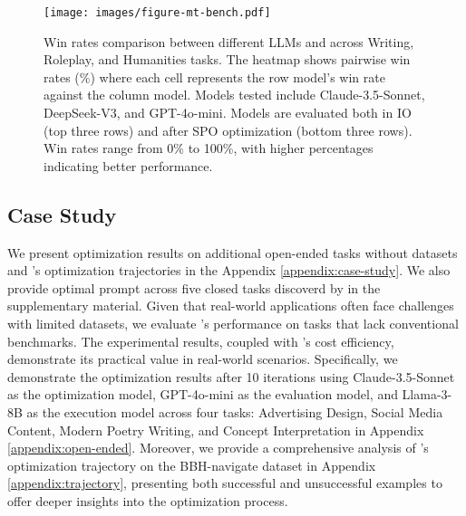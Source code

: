 \begin{figure}[t!]
  \centering
  \texttt{[image: images/figure-mt-bench.pdf]}
  \vspace{-2em}
  \caption{Win rates comparison between different LLMs and \ours across Writing, Roleplay, and Humanities tasks. The heatmap shows pairwise win rates (\%) where each cell represents the row model's win rate against the column model. Models tested include Claude-3.5-Sonnet, DeepSeek-V3, and GPT-4o-mini. Models are evaluated both in IO (top three rows) and after SPO optimization (bottom three rows). Win rates range from 0\% to 100\%, with higher percentages indicating better performance.}
  \label{fig:mt-bench}
\end{figure}

\subsection{Case Study}

We present optimization results on additional open-ended tasks without datasets and \ours's optimization trajectories in the Appendix \ref{appendix:case-study}. We also provide optimal prompt across five closed tasks discoverd by \ours in the supplementary material.
Given that real-world applications often face challenges with limited datasets, we evaluate \ours's performance on tasks that lack conventional benchmarks. The experimental results, coupled with \ours's cost efficiency, demonstrate its practical value in real-world scenarios. Specifically, we demonstrate the optimization results after 10 iterations using Claude-3.5-Sonnet as the optimization model, GPT-4o-mini as the evaluation model, and Llama-3-8B as the execution model across four tasks: Advertising Design, Social Media Content, Modern Poetry Writing, and Concept Interpretation in Appendix \ref{appendix:open-ended}. Moreover, we provide a comprehensive analysis of \ours's optimization trajectory on the BBH-navigate dataset in Appendix \ref{appendix:trajectory}, presenting both successful and unsuccessful examples to offer deeper insights into the optimization process.

